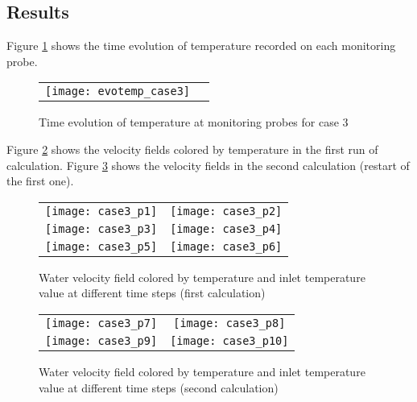         \subsection{Results}
Figure \ref{fige3_e3} shows the time evolution of temperature recorded on each
monitoring probe.
\begin{figure}[hb]
\begin{center}
\begin{tabular}{cc}
\texttt{[image: evotemp\_case3]} \\
\end{tabular}
\caption{Time evolution of temperature at monitoring probes for case 3}
\label{fige3_e3}
\end{center}
\end{figure}
\vspace{-0.15in}
Figure \ref{fige1_e3} shows the velocity fields colored by temperature in the
first run of calculation. Figure \ref{fige2_e3} shows the velocity fields in the
second calculation (restart of the first one).

\begin{figure}
\begin{center}
\begin{tabular}{cc}
\texttt{[image: case3\_p1]} &
\texttt{[image: case3\_p2]} \\
\texttt{[image: case3\_p3]} &
\texttt{[image: case3\_p4]} \\
\texttt{[image: case3\_p5]} &
\texttt{[image: case3\_p6]} \\
\end{tabular}
\caption{Water velocity field colored by temperature and inlet temperature value
at different time steps (first calculation)}
\label{fige1_e3}
\end{center}
\end{figure}


\begin{figure}
\begin{center}
\begin{tabular}{cc}
\texttt{[image: case3\_p7]} &
\texttt{[image: case3\_p8]} \\
\texttt{[image: case3\_p9]} &
\texttt{[image: case3\_p10]} \\
\end{tabular}
\caption{Water velocity field colored by temperature and inlet temperature value
at different time steps (second calculation)}
\label{fige2_e3}
\end{center}
\end{figure}
\vspace{-0.1in}




